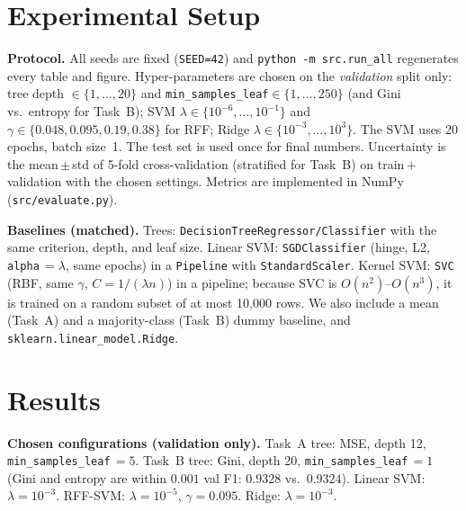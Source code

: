 \documentclass[10pt,twocolumn,a4paper]{article}
\begin{document}
\section{Experimental Setup}
\textbf{Protocol.} All seeds are fixed (\texttt{SEED=42}) and
\texttt{python -m src.run\_all} regenerates every table and figure. Hyper-parameters
are chosen on the \emph{validation} split only: tree depth
$\in\{1,\dots,20\}$ and \texttt{min\_samples\_leaf}$\in\{1,\dots,250\}$ (and
Gini vs.\ entropy for Task~B); SVM $\lambda\in\{10^{-6},\dots,10^{-1}\}$ and
$\gamma\in\{0.048,0.095,0.19,0.38\}$ for RFF; Ridge $\lambda\in\{10^{-3},\dots,10^{3}\}$.
The SVM uses 20 epochs, batch size~1. The test set is used once for final
numbers. Uncertainty is the mean\,$\pm$\,std of 5-fold cross-validation
(stratified for Task~B) on train\,$+$\,validation with the chosen settings.
Metrics are implemented in NumPy (\texttt{src/evaluate.py}).

\textbf{Baselines (matched).} Trees: \texttt{DecisionTreeRegressor/Classifier} with the
same criterion, depth, and leaf size. Linear SVM: \texttt{SGDClassifier}
(hinge, L2, \texttt{alpha}\,$=\lambda$, same epochs) in a \texttt{Pipeline} with
\texttt{StandardScaler}. Kernel SVM: \texttt{SVC} (RBF, same $\gamma$,
$C=1/(\lambda n)$) in a pipeline; because SVC is $O(n^2)$--$O(n^3)$, it is trained
on a random subset of at most 10{,}000 rows. We also include a mean (Task~A) and a
majority-class (Task~B) dummy baseline, and \texttt{sklearn.linear\_model.Ridge}.

\section{Results}
\textbf{Chosen configurations (validation only).} Task~A tree: MSE, depth 12,
\texttt{min\_samples\_leaf}\,$=5$. Task~B tree: Gini, depth 20,
\texttt{min\_samples\_leaf}\,$=1$ (Gini and entropy are within $0.001$ val F1:
$0.9328$ vs.\ $0.9324$). Linear SVM: $\lambda=10^{-3}$. RFF-SVM:
$\lambda=10^{-5}$, $\gamma=0.095$. Ridge: $\lambda=10^{-3}$.
\end{document}
